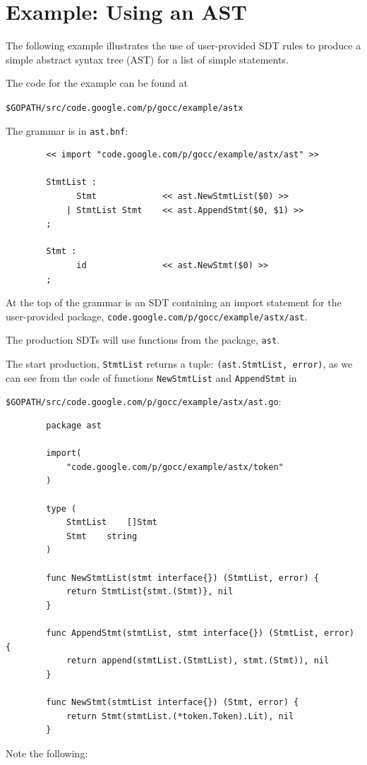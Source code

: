 \documentclass[12pt]{article}
\begin{document}
\section{Example: Using an AST} \label{sec:example ast}
	The following example illustrates the use of user-provided SDT rules to produce a simple abstract syntax tree (AST) for a list of simple statements. 

	The code for the example can be found at

	\verb|$GOPATH/src/code.google.com/p/gocc/example/astx|

	The grammar is in \verb|ast.bnf|:

	\begin{verbatim}
		<< import "code.google.com/p/gocc/example/astx/ast" >>

		StmtList : 
		      Stmt             << ast.NewStmtList($0) >>
		    | StmtList Stmt    << ast.AppendStmt($0, $1) >>
		;

		Stmt : 
		      id               << ast.NewStmt($0) >>
		;
	\end{verbatim}

	At the top of the grammar is an SDT containing an import statement for the user-provided package, 
	\verb|code.google.com/p/gocc/example/astx/ast|.

	The production SDTs will use functions from the package, \verb|ast|.

	The start production, \verb"StmtList" returns a tuple: \verb|(ast.StmtList, error)|, as we can see from the code of functions 
	\verb|NewStmtList| and \verb|AppendStmt| in 

	\verb|$GOPATH/src/code.google.com/p/gocc/example/astx/ast.go|:

	\begin{verbatim}
		package ast

		import(
		    "code.google.com/p/gocc/example/astx/token"
		)

		type (
		    StmtList	[]Stmt
		    Stmt 	string
		)

		func NewStmtList(stmt interface{}) (StmtList, error) {
		    return StmtList{stmt.(Stmt)}, nil
		}

		func AppendStmt(stmtList, stmt interface{}) (StmtList, error) {
		    return append(stmtList.(StmtList), stmt.(Stmt)), nil
		}	

		func NewStmt(stmtList interface{}) (Stmt, error) {
		    return Stmt(stmtList.(*token.Token).Lit), nil
		}
	\end{verbatim}

	Note the following:
\end{document}
